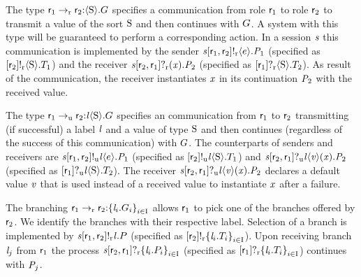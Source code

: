 The type $ \GComR{\Role_1}{\Role_2}{\Sort}{\GT} $ specifies a \strongR communication from role $ \Role_1 $ to role $ \Role_2 $ to transmit a value of the sort $ \Sort $ and then continues with $ \GT $.
A system with this type will be guaranteed to perform a corresponding action.
In a session $ \Chan $ this communication is implemented by the sender $ \PSendR{\Chan}{\Role_1}{\Role_2}{\Expr}{\PT_1} $ (specified as $ \LSendR{\Role_2}{\Sort}{\LT_1} $) and the receiver $ \PGetR{\Chan}{\Role_2}{\Role_1}{\Args}{\PT_2} $ (specified as $ \LGetR{\Role_1}{\Sort}{\LT_2} $).
As result of the communication, the receiver instantiates $ \Args $ in its continuation $ \PT_2 $ with the received value.

The type $ \GComU{\Role_1}{\Role_2}{\Label}{\Sort}{\GT} $ specifies an \unrel communication from $ \Role_1 $ to $ \Role_2 $ transmitting (if successful) a label $ \Label $ and a value of type $ \Sort $ and then continues (regardless of the success of this communication) with $ \GT $.
The \unrel counterparts of senders and receivers are $ \PSendU{\Chan}{\Role_1}{\Role_2}{\Label}{\Expr}{\PT_1} $ (specified as $ \LSendU{\Role_2}{\Label}{\Sort}{\LT_1} $) and $ \PGetU{\Chan}{\Role_2}{\Role_1}{\Label}{\Args[v]}{\Args}{\PT_2} $ (specified as $ \LGetU{\Role_1}{\Label}{\Sort}{\LT_2} $).
The receiver $ \PGetU{\Chan}{\Role_2}{\Role_1}{\Label}{\Args[v]}{\Args}{\PT_2} $ declares a default value $ \Args[v] $ that is used instead of a received value to instantiate $ \Args $ after a failure.

The \strongR branching $ \GBranR{\Role_1}{\Role_2}{\Set{ \Label_i.\GT_i}_{i \in \indexSet}} $ allows $ \Role_1 $ to pick one of the branches offered by $ \Role_2 $.
We identify the branches with their respective label.
Selection of a branch is implemented by $ \PSelR{\Chan}{\Role_1}{\Role_2}{\Label}{P} $ (specified as $ \LSelR{\Role_2}{\Set{ \Label_i.\LT_i }_{i \in \indexSet}} $).
Upon receiving branch $ \Label_j $ from $ \Role_1 $ the process $ \PBranR{\Chan}{\Role_2}{\Role_1}{\Set{ \Label_i.P_i }_{i \in \indexSet}} $ (specified as $ \LBranR{\Role_1}{\Set{ \Label_i.\LT_i }_{i \in \indexSet}} $) continues with $ \PT_j $.

